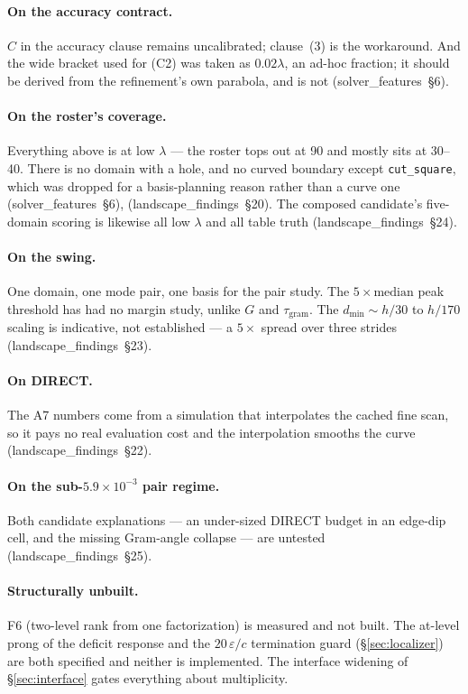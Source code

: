 \documentclass[11pt]{article}
\newcommand{\file}[1]{\texttt{#1}}
\newcommand{\lf}[1]{(landscape\_findings~\S#1)}
\newcommand{\sfe}[1]{(solver\_features~\S#1)}
\newcommand{\lam}{\lambda}
\begin{document}
\paragraph{On the accuracy contract.} $C$ in the accuracy clause remains uncalibrated; clause~(3)
is the workaround. And the wide bracket used for (C2) was taken as $0.02\lam$, an ad-hoc fraction;
it should be derived from the refinement's own parabola, and is not \sfe{6}.

\paragraph{On the roster's coverage.} Everything above is at low $\lam$ --- the roster tops out at
90 and mostly sits at 30--40. There is no domain with a hole, and no curved boundary except
\file{cut\_square}, which was dropped for a basis-planning reason rather than a curve one
\sfe{6}, \lf{20}. The composed candidate's five-domain scoring is likewise all low $\lam$ and all
table truth \lf{24}.

\paragraph{On the swing.} One domain, one mode pair, one basis for the pair study. The
$5\times\text{median}$ peak threshold has had no margin study, unlike $G$ and
$\tau_{\mathrm{gram}}$. The $d_{\min} \sim h/30$ to $h/170$ scaling is indicative, not established
--- a $5\times$ spread over three strides \lf{23}.

\paragraph{On DIRECT.} The A7 numbers come from a simulation that interpolates the cached fine
scan, so it pays no real evaluation cost and the interpolation smooths the curve \lf{22}.

\paragraph{On the sub-$5.9\times10^{-3}$ pair regime.} Both candidate explanations --- an
under-sized DIRECT budget in an edge-dip cell, and the missing Gram-angle collapse --- are
untested \lf{25}.

\paragraph{Structurally unbuilt.} F6 (two-level rank from one factorization) is measured and not
built. The at-level prong of the deficit response and the $20\,\varepsilon/c$ termination guard
(\S\ref{sec:localizer}) are both specified and neither is implemented. The interface widening of
\S\ref{sec:interface} gates everything about multiplicity.
\end{document}
